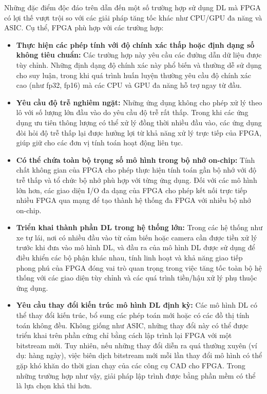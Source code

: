 \documentclass[a4paper]{article}
\begin{document}
Những đặc điểm độc đáo trên dẫn đến một số trường hợp sử dụng DL mà FPGA có lợi thế vượt trội so với các giải pháp tăng tốc khác như CPU/GPU đa năng và ASIC. Cụ thể, FPGA phù hợp với các trường hợp:
\begin{itemize}
    \item \textbf{Thực hiện các phép tính với độ chính xác thấp hoặc định dạng số không tiêu chuẩn:} Các trường hợp này yêu cầu các đường dẫn dữ liệu được tùy chỉnh. Những định dạng độ chính xác này phổ biến và thường dễ sử dụng cho suy luận, trong khi quá trình huấn luyện thường yêu cầu độ chính xác cao (như fp32, fp16) mà các CPU và GPU đa năng hỗ trợ ngay từ đầu.
    \item \textbf{Yêu cầu độ trễ nghiêm ngặt:} Những ứng dụng không cho phép xử lý theo lô với số lượng lớn đầu vào do yêu cầu độ trễ rất thấp. Trong khi các ứng dụng ưu tiên thông lượng có thể xử lý đồng thời nhiều đầu vào, các ứng dụng đòi hỏi độ trễ thấp lại được hưởng lợi từ khả năng xử lý trực tiếp của FPGA, giúp giữ cho các đơn vị tính toán hoạt động liên tục.
    \item \textbf{Có thể chứa toàn bộ trọng số mô hình trong bộ nhớ on-chip:} Tính chất không gian của FPGA cho phép thực hiện tính toán gần bộ nhớ với độ trễ thấp và tổ chức bộ nhớ phù hợp với từng ứng dụng. Đối với các mô hình lớn hơn, các giao diện I/O đa dạng của FPGA cho phép kết nối trực tiếp nhiều FPGA qua mạng để tạo thành hệ thống đa FPGA với nhiều bộ nhớ on-chip.
    \item \textbf{Triển khai thành phần DL trong hệ thống lớn:} Trong các hệ thống như xe tự lái, nơi có nhiều đầu vào từ cảm biến hoặc camera cần được tiền xử lý trước khi đưa vào mô hình DL, và đầu ra của mô hình DL được sử dụng để điều khiển các bộ phận khác nhau, tính linh hoạt và khả năng giao tiếp phong phú của FPGA đóng vai trò quan trọng trong việc tăng tốc toàn bộ hệ thống với các giao diện tùy chỉnh và các quá trình tiền/hậu xử lý phụ thuộc ứng dụng.
    \item \textbf{Yêu cầu thay đổi kiến trúc mô hình DL định kỳ:} Các mô hình DL có thể thay đổi kiến trúc, bổ sung các phép toán mới hoặc có các đồ thị tính toán không đều. Không giống như ASIC, những thay đổi này có thể được triển khai trên phần cứng chỉ bằng cách lập trình lại FPGA với một bitstream mới. Tuy nhiên, nếu những thay đổi diễn ra quá thường xuyên (ví dụ: hàng ngày), việc biên dịch bitstream mới mỗi lần thay đổi mô hình có thể gặp khó khăn do thời gian chạy của các công cụ CAD cho FPGA. Trong những trường hợp như vậy, giải pháp lập trình được bằng phần mềm có thể là lựa chọn khả thi hơn.
\end{itemize}
\end{document}
